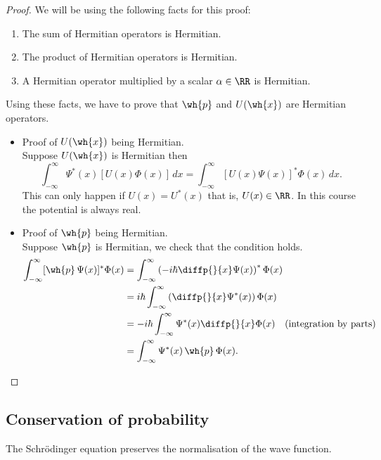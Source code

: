 \documentclass[12pt, a4paper]{article}
\begin{document}
\begin{proof}
    We will be using the following facts for this proof:
    \begin{enumerate}
        \item The sum of Hermitian operators is Hermitian.
        \item The product of Hermitian operators is Hermitian.
        \item A Hermitian operator multiplied by a scalar \(\alpha \in \RR\) is Hermitian.
    \end{enumerate}
    Using these facts, we have to prove that \(\wh{p}\) and \(U(\wh{x})\) are Hermitian operators.
    \begin{itemize}
        \item Proof of \(U(\wh{x})\) being Hermitian. \\
        Suppose \(U(\wh{x})\) is Hermitian then 
        \[\int_{-\infty}^{\infty} \Psi^*(x) [U(x)\Phi(x)] \, dx = \int_{-\infty}^{\infty} [U(x)\Psi(x)]^* \Phi(x) \, dx.\]
        This can only happen if \(U(x) = U^*(x)\) that is, \(U(x) \in \RR\). In this course the potential is always real.
        \item Proof of \(\wh{p}\) being Hermitian. \\
        Suppose \(\wh{p}\) is Hermitian, we check that the condition holds.
        \[\begin{aligned}
            \int_{-\infty}^{\infty} [\wh{p} \, \Psi(x)]^* \Phi(x) &= \int_{-\infty}^{\infty} \left( -i \hbar \diffp{}{x} \Psi(x) \right)^* \Phi(x) \\
            &= i \hbar \int_{-\infty}^{\infty} \left( \diffp{}{x} \Psi^*(x) \right) \Phi(x) \\
            &= - i \hbar \int_{-\infty}^{\infty} \Psi^*(x) \diffp{}{x} \Phi(x) \quad \text{(integration by parts)}\\
            &= \int_{-\infty}^{\infty} \Psi^*(x) \,\wh{p} \, \Phi(x).
        \end{aligned}\]
    \end{itemize}
\end{proof}

\subsection{Conservation of probability}

\begin{mdthm}
    The Schrödinger equation preserves the normalisation of the wave function.
\end{mdthm}
\end{document}
